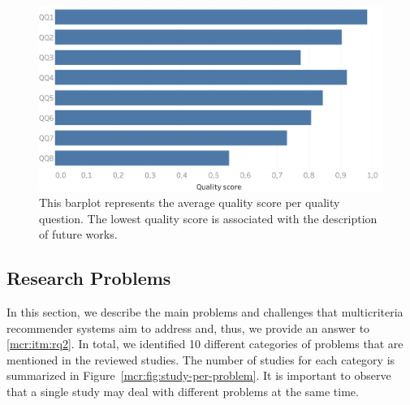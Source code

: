 \begin{figure}
\centering
\includegraphics[width=\textwidth]{quality_per_question}
\caption[Quality score per quality question]{This barplot represents the average quality score per quality question. The lowest quality score is associated with the description of future works.}
\label{mcr:fig:quality-per-question}
\end{figure}

\subsection{Research Problems}
\label{mcr:sec:problems}

In this section, we describe the main problems and challenges that multicriteria recommender systems aim to address and, thus, we provide an answer to \ref{mcr:itm:rq2}. In total, we identified 10 different categories of problems that are mentioned in the reviewed studies. The number of studies for each category is summarized in Figure~\ref{mcr:fig:study-per-problem}. It is important to observe that a single study may deal with different problems at the same time.


